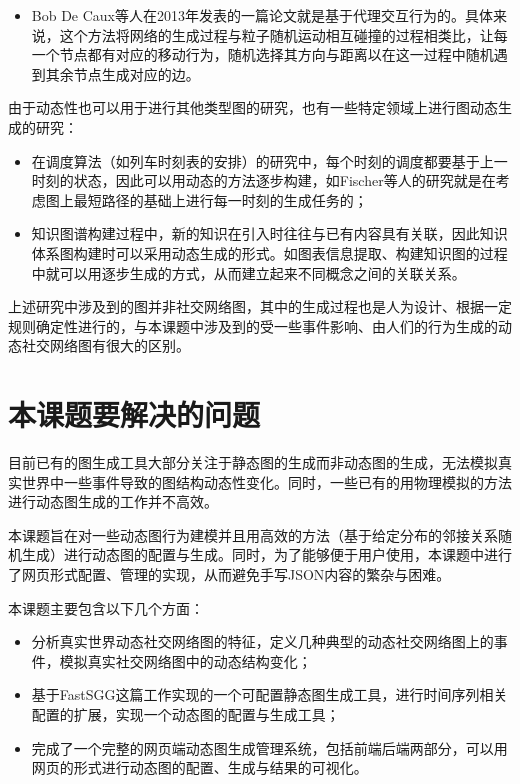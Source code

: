 \begin{itemize}
  \item Bob De Caux等人在2013年发表的一篇论文\cite{De2014Dynamic}就是基于代理交互行为的。具体来说，这个方法将网络的生成过程与粒子随机运动相互碰撞的过程相类比，让每一个节点都有对应的移动行为，随机选择其方向与距离以在这一过程中随机遇到其余节点生成对应的边。
\end{itemize}

\vspace{0.2cm}

由于动态性也可以用于进行其他类型图的研究，也有一些特定领域上进行图动态生成的研究：

\begin{itemize}
  \item 在调度算法（如列车时刻表的安排）的研究中，每个时刻的调度都要基于上一时刻的状态，因此可以用动态的方法逐步构建，如Fischer等人的研究\cite{Fischer2011Dynamic}就是在考虑图上最短路径的基础上进行每一时刻的生成任务的；
  \item 知识图谱构建过程中，新的知识在引入时往往与已有内容具有关联，因此知识体系图构建时可以采用动态生成的形式。如图表信息提取、构建知识图的过程中就可以用逐步生成的方式\cite{Kim2017Dynamic}，从而建立起来不同概念之间的关联关系。
\end{itemize}

\vspace{0.2cm}

上述研究中涉及到的图并非社交网络图，其中的生成过程也是人为设计、根据一定规则确定性进行的，与本课题中涉及到的受一些事件影响、由人们的行为生成的动态社交网络图有很大的区别。

\section{本课题要解决的问题}
\label{content:problem}

目前已有的图生成工具大部分关注于静态图的生成而非动态图的生成，无法模拟真实世界中一些事件导致的图结构动态性变化。同时，一些已有的用物理模拟的方法进行动态图生成的工作并不高效。

本课题旨在对一些动态图行为建模并且用高效的方法（基于给定分布的邻接关系随机生成）进行动态图的配置与生成。同时，为了能够便于用户使用，本课题中进行了网页形式配置、管理的实现，从而避免手写JSON内容的繁杂与困难。

本课题主要包含以下几个方面：

\begin{itemize}
  \item 分析真实世界动态社交网络图的特征，定义几种典型的动态社交网络图上的事件，模拟真实社交网络图中的动态结构变化；
  \item 基于FastSGG这篇工作实现的一个可配置静态图生成工具，进行时间序列相关配置的扩展，实现一个动态图的配置与生成工具；
  \item 完成了一个完整的网页端动态图生成管理系统，包括前端后端两部分，可以用网页的形式进行动态图的配置、生成与结果的可视化。
\end{itemize}
